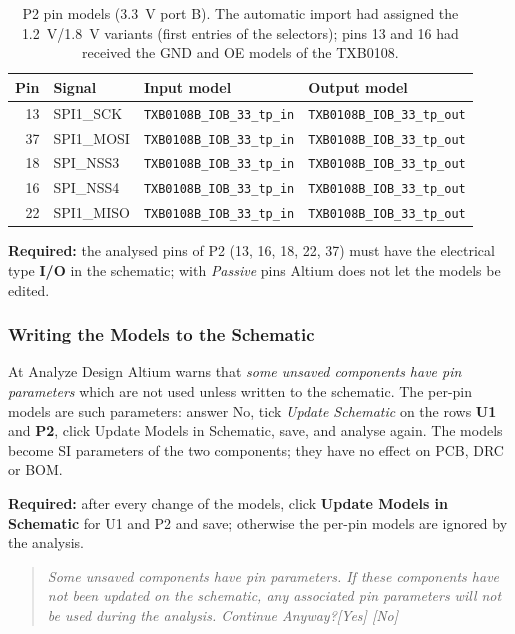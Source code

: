 \documentclass[11pt,a4paper]{article}
\newcommand{\required}[1]{\begin{reqbox}\textbf{\color{reqred}Required:} #1\end{reqbox}}
\newcommand{\gui}[1]{\textsf{#1}}
\newenvironment{dialog}{\begin{quote}\small\itshape}{\end{quote}}
\begin{document}
\begin{table}[H]
\centering
\begin{tabular}{rlll}
\toprule
Pin & Signal & Input model & Output model \\
\midrule
13 & SPI1\_SCK  & \texttt{TXB0108B\_IOB\_33\_tp\_in} & \texttt{TXB0108B\_IOB\_33\_tp\_out} \\
37 & SPI1\_MOSI & \texttt{TXB0108B\_IOB\_33\_tp\_in} & \texttt{TXB0108B\_IOB\_33\_tp\_out} \\
18 & SPI\_NSS3  & \texttt{TXB0108B\_IOB\_33\_tp\_in} & \texttt{TXB0108B\_IOB\_33\_tp\_out} \\
16 & SPI\_NSS4  & \texttt{TXB0108B\_IOB\_33\_tp\_in} & \texttt{TXB0108B\_IOB\_33\_tp\_out} \\
22 & SPI1\_MISO & \texttt{TXB0108B\_IOB\_33\_tp\_in} & \texttt{TXB0108B\_IOB\_33\_tp\_out} \\
\bottomrule
\end{tabular}
\caption{P2 pin models (\qty{3.3}{V} port B). The automatic import had assigned the \qty{1.2}{V}/\qty{1.8}{V}
variants (first entries of the selectors); pins 13 and 16 had received the GND and OE models of
the TXB0108.}
\label{tab:p2models}
\end{table}

\required{the analysed pins of P2 (13, 16, 18, 22, 37) must have the electrical type \textbf{I/O} in
the schematic; with \textit{Passive} pins Altium does not let the models be edited.}

\subsubsection{Writing the Models to the Schematic}

At \gui{Analyze Design} Altium warns that \textit{some unsaved components have pin parameters} which are
not used unless written to the schematic. The per-pin models are such parameters: answer \gui{No},
tick \textit{Update Schematic} on the rows \textbf{U1} and \textbf{P2}, click \gui{Update Models in Schematic}, save, and
analyse again. The models become SI parameters of the two components; they have no effect on
PCB, DRC or BOM.

\required{after every change of the models, click \textbf{Update Models in Schematic} for U1
and P2 and save; otherwise the per-pin models are ignored by the analysis.}

\begin{dialog}
Some unsaved components have pin parameters. If these components have not been updated
on the schematic, any associated pin parameters will not be used during the analysis. Continue
Anyway?\quad\upshape\gui{[Yes] [No]}
\end{dialog}
\end{document}
